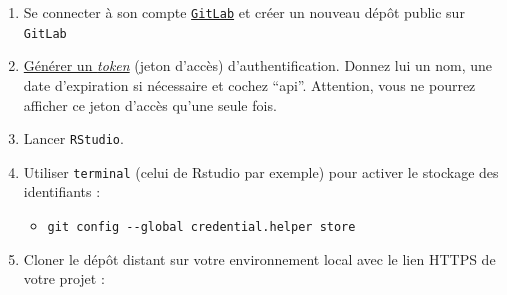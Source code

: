 \documentclass[
  letterpaper,
  DIV=11,
  numbers=noendperiod]{scrartcl}
\providecommand{\tightlist}{%
  \setlength{\itemsep}{0pt}\setlength{\parskip}{0pt}}\usepackage{longtable,booktabs,array}
\begin{document}
\begin{tcolorbox}[enhanced jigsaw, colframe=quarto-callout-tip-color-frame, rightrule=.15mm, breakable, colbacktitle=quarto-callout-tip-color!10!white, coltitle=black, toptitle=1mm, title={Préparation de l'environnement de travail sur Rstudio}, titlerule=0mm, leftrule=.75mm, colback=white, bottomrule=.15mm, bottomtitle=1mm, toprule=.15mm, opacitybacktitle=0.6, arc=.35mm, left=2mm, opacityback=0]

\begin{enumerate}
\def\labelenumi{\arabic{enumi}.}
\tightlist
\item
  Se connecter à son compte
  \href{https://gitlab.intranet.social.gouv.fr/}{\texttt{GitLab}} et
  créer un nouveau dépôt public sur \texttt{GitLab}
\item
  \href{https://gitlab.intranet.social.gouv.fr/profile/personal_access_tokens}{Générer
  un \emph{token}} (jeton d'accès) d'authentification. Donnez lui un
  nom, une date d'expiration si nécessaire et cochez ``api''. Attention,
  vous ne pourrez afficher ce jeton d'accès qu'une seule fois.
\item
  Lancer \texttt{RStudio}.
\item
  Utiliser \texttt{terminal} (celui de Rstudio par exemple) pour activer
  le stockage des identifiants :

  \begin{itemize}
  \tightlist
  \item
    \texttt{git\ config\ -\/-global\ credential.helper\ store}
  \end{itemize}
\item
  Cloner le dépôt distant sur votre environnement local avec le lien
  HTTPS de votre projet :


\end{enumerate}
\end{tcolorbox}
\end{document}
